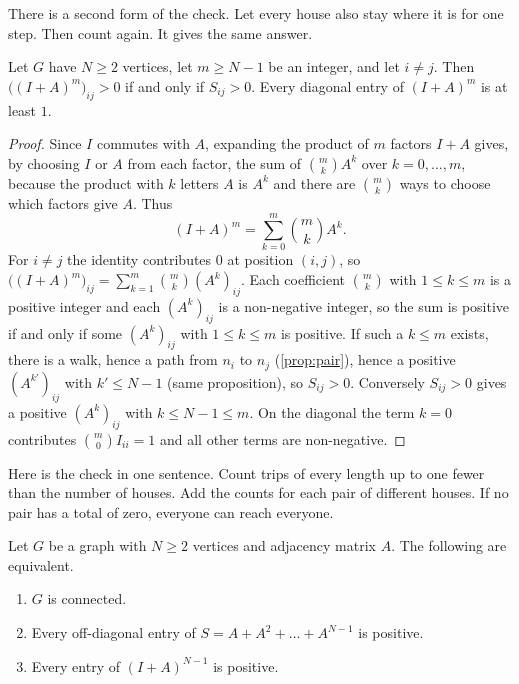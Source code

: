 \plainwords There is a second form of the check.
Let every house also stay where it is for one step.
Then count again.
It gives the same answer.

\begin{proposition}\label{prop:iplusa}
Let $G$ have $N\ge 2$ vertices, let $m\ge N-1$ be an integer, and let $i\ne j$.
Then $\bigl((I+A)^m\bigr)_{ij}>0$ if and only if $S_{ij}>0$.
Every diagonal entry of $(I+A)^m$ is at least $1$.
\end{proposition}

\begin{proof}
Since $I$ commutes with $A$, expanding the product of $m$ factors $I+A$ gives, by choosing $I$ or $A$ from each factor, the sum of $\binom{m}{k}A^k$ over $k=0,\dots,m$, because the product with $k$ letters $A$ is $A^k$ and there are $\binom mk$ ways to choose which factors give $A$.
Thus
\[
(I+A)^m=\sum_{k=0}^{m}\binom{m}{k}A^k .
\]
For $i\ne j$ the identity contributes $0$ at position $(i,j)$, so $\bigl((I+A)^m\bigr)_{ij}=\sum_{k=1}^{m}\binom mk (A^k)_{ij}$.
Each coefficient $\binom mk$ with $1\le k\le m$ is a positive integer and each $(A^k)_{ij}$ is a non-negative integer, so the sum is positive if and only if some $(A^k)_{ij}$ with $1\le k\le m$ is positive.
If such a $k\le m$ exists, there is a walk, hence a path from $n_i$ to $n_j$ (\cref{prop:pair}), hence a positive $(A^{k'})_{ij}$ with $k'\le N-1$ (same proposition), so $S_{ij}>0$.
Conversely $S_{ij}>0$ gives a positive $(A^k)_{ij}$ with $k\le N-1\le m$.
On the diagonal the term $k=0$ contributes $\binom m0 I_{ii}=1$ and all other terms are non-negative.
\end{proof}

\plainwords Here is the check in one sentence.
Count trips of every length up to one fewer than the number of houses.
Add the counts for each pair of different houses.
If no pair has a total of zero, everyone can reach everyone.

\begin{theorem}\label{thm:test}
Let $G$ be a graph with $N\ge 2$ vertices and adjacency matrix $A$.
The following are equivalent.
\begin{enumerate}
\item[(a)] $G$ is connected.
\item[(b)] Every off-diagonal entry of $S=A+A^2+\dots+A^{N-1}$ is positive.
\item[(c)] Every entry of $(I+A)^{N-1}$ is positive.
\end{enumerate}
\end{theorem}


